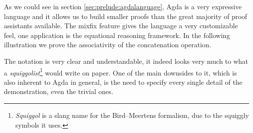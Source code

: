 As we could see in section \ref{sec:prelude:agdalanguage}, Agda is a very expressive language
and it allows us to build smaller proofs than the great majority of proof assistants available.
The mixfix feature gives the language a very customizable feel, one application is the
equational reasoning framework. In the following illustration we prove the associativity of
the concatenation operation.


The notation is very clear and understandable, it indeed looks very much
to what a \emph{squiggolist}\footnote{
\emph{Squiggol} is a slang name for the Bird–Meertens formalism, due to the squiggly symbols it
uses.
} would write on paper. One of the main downsides to it, which is also inherent to Agda in general,
is the need to specify every single detail of the demonstration, even the trivial ones.
